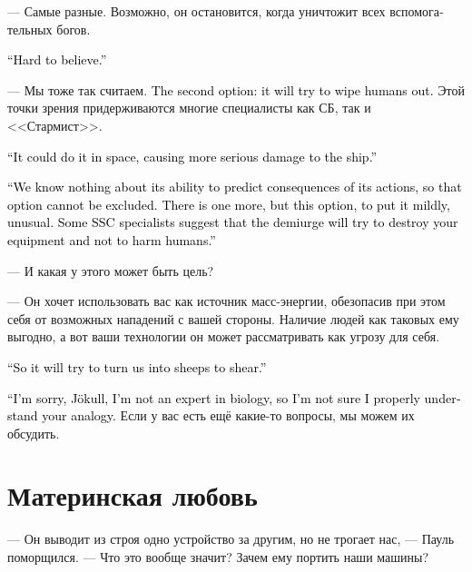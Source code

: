 \documentclass[a4paper,12pt,fleqn]{book}\usepackage{cooltooltips}\usepackage{polyglossia}\setdefaultlanguage[babelshorthands=true]{russian}\setotherlanguage{english}\defaultfontfeatures{Ligatures=TeX,Mapping=tex-text} \usepackage{xcolor}\definecolor{lightgray}{HTML}{bbbbbb}\color{lightgray}\newcommand{\ml}[3]{\textenglish{\textcolor{black}{#3}}}
\newcommand{\asterism}{\vspace{1em}{\centering\Large\bfseries$\ast~\ast~\ast$\par}\vspace{1em}}
\begin{document}
--- Самые разные.
Возможно, он остановится, когда уничтожит всех вспомогательных богов.

\ml{$0$}
{--- Это сомнительно.}
{``Hard to believe.''}

--- Мы тоже так считаем.
\ml{$0$}
{Второй вариант --- он попытается уничтожить людей.}
{The second option: it will try to wipe humans out.}
Этой точки зрения придерживаются многие специалисты как СБ, так и <<Стармист>>.

\ml{$0$}
{--- Он мог уничтожить нас ещё в космосе, нанеся кораблю более значимые повреждения.}
{``It could do it in space, causing more serious damage to the ship.''}

\ml{$0$}
{--- Мы не знаем о том, насколько он способен предсказывать последствия своих действий, поэтому этот вариант исключать нельзя.}
{``We know nothing about its ability to predict consequences of its actions, so that option cannot be excluded.}
\ml{$0$}
{Есть ещё третий вариант, но он, мягко говоря, необычный.}
{There is one more, but this option, to put it mildly, unusual.}
\ml{$0$}
{Некоторые специалисты СБ предполагают, что демиург попытается уничтожить вашу технику, стараясь не причинить вреда людям.}
{Some SSC specialists suggest that the demiurge will try to destroy your equipment and not to harm humans.''}

--- И какая у этого может быть цель?

--- Он хочет использовать вас как источник масс-энергии, обезопасив при этом себя от возможных нападений с вашей стороны.
Наличие людей как таковых ему выгодно, а вот ваши технологии он может рассматривать как угрозу для себя.

\ml{$0$}
{--- То есть из нас делают овечек и собираются стричь.}
{``So it will try to turn us into sheeps to shear.''}

\ml{$0$}
{--- Простите, Йокудль, я не специалист в биологии и не вполне понимаю вашу аналогию.}
{``I'm sorry, Jökull, I'm not an expert in biology, so I'm not sure I properly understand your analogy.}
Если у вас есть ещё какие-то вопросы, мы можем их обсудить.

\section{Материнская любовь}

--- Он выводит из строя одно устройство за другим, но не трогает нас, --- Пауль поморщился.
--- Что это вообще значит?
Зачем ему портить наши машины?

\asterism
\end{document}
